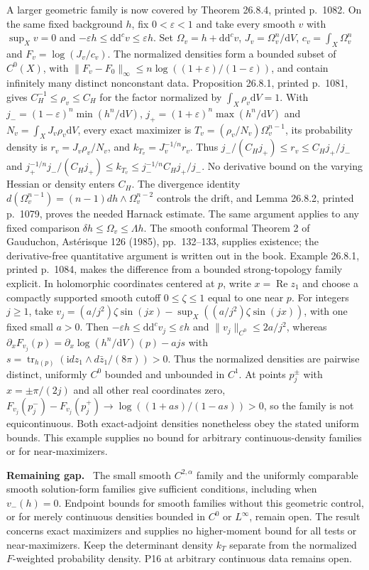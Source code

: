 \documentclass[11pt]{article}
\newcommand{\ddc}{\mathrm d\mathrm d^c}
\newcommand{\field}[1]{\par\medskip\noindent\textbf{#1.}\ }
\begin{document}
 A larger geometric family is now covered by Theorem 26.8.4, printed p.~1082. On the same fixed background $h$, fix $0<\varepsilon<1$ and take every smooth $v$ with $\sup_Xv=0$ and $-\varepsilon h\leq\ddc v\leq\varepsilon h$. Set $\Omega_v=h+\ddc v$, $J_v=\Omega_v^n/\mathrm dV$, $c_v=\int_X\Omega_v^n$ and $F_v=\log(J_v/c_v)$. The normalized densities form a bounded subset of $C^0(X)$, with $\|F_v-F_0\|_\infty\leq n\log((1+\varepsilon)/(1-\varepsilon))$, and contain infinitely many distinct nonconstant data. Proposition 26.8.1, printed p.~1081, gives $C_H^{-1}\leq\rho_v\leq C_H$ for the factor normalized by $\int_X\rho_v\mathrm dV=1$. With $j_-=(1-\varepsilon)^n\min(h^n/\mathrm dV)$, $j_+=(1+\varepsilon)^n\max(h^n/\mathrm dV)$ and $N_v=\int_XJ_v\rho_v\mathrm dV$, every exact maximizer is $T_v=(\rho_v/N_v)\Omega_v^{n-1}$, its probability density is $r_v=J_v\rho_v/N_v$, and $k_{T_v}=J_v^{-1/n}r_v$. Thus $j_-/(C_Hj_+)\leq r_v\leq C_Hj_+/j_-$ and $j_+^{-1/n}j_-/(C_Hj_+)\leq k_{T_v}\leq j_-^{-1/n}C_Hj_+/j_-$. No derivative bound on the varying Hessian or density enters $C_H$. The divergence identity $d(\Omega_v^{n-1})=(n-1)dh\wedge\Omega_v^{n-2}$ controls the drift, and Lemma 26.8.2, printed p.~1079, proves the needed Harnack estimate. The same argument applies to any fixed comparison $\delta h\leq\Omega_v\leq\Lambda h$. The smooth conformal Theorem 2 of Gauduchon, Ast\'erisque 126 (1985), pp.~132--133, supplies existence; the derivative-free quantitative argument is written out in the book.
 Example 26.8.1, printed p.~1084, makes the difference from a bounded strong-topology family explicit. In holomorphic coordinates centered at $p$, write $x=\operatorname{Re}z_1$ and choose a compactly supported smooth cutoff $0\leq\zeta\leq1$ equal to one near $p$. For integers $j\geq1$, take $v_j=(a/j^2)\zeta\sin(jx)-\sup_X((a/j^2)\zeta\sin(jx))$, with one fixed small $a>0$. Then $-\varepsilon h\leq\ddc v_j\leq\varepsilon h$ and $\|v_j\|_{C^0}\leq2a/j^2$, whereas $\partial_xF_{v_j}(p)=\partial_x\log(h^n/\mathrm dV)(p)-ajs$ with $s=\operatorname{tr}_{h(p)}(\mathrm i dz_1\wedge d\bar z_1/(8\pi))>0$. Thus the normalized densities are pairwise distinct, uniformly $C^0$ bounded and unbounded in $C^1$. At points $p_j^\pm$ with $x=\pm\pi/(2j)$ and all other real coordinates zero, $F_{v_j}(p_j^-)-F_{v_j}(p_j^+)\to\log((1+as)/(1-as))>0$, so the family is not equicontinuous. Both exact-adjoint densities nonetheless obey the stated uniform bounds. This example supplies no bound for arbitrary continuous-density families or for near-maximizers.
\field{Remaining gap} The small smooth $C^{2,\alpha}$ family and the uniformly comparable smooth solution-form families give sufficient conditions, including when $v_-(h)=0$. Endpoint bounds for smooth families without this geometric control, or for merely continuous densities bounded in $C^0$ or $L^\infty$, remain open. The result concerns exact maximizers and supplies no higher-moment bound for all tests or near-maximizers. Keep the determinant density $k_T$ separate from the normalized $F$-weighted probability density. P16 at arbitrary continuous data remains open.
\end{document}
